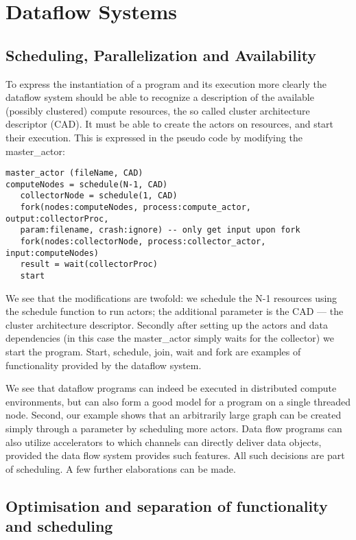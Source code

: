 \documentclass[11pt,a4paper]{article}
\begin{document}
\section{Dataflow Systems}

\subsection{Scheduling, Parallelization and Availability}

To express the instantiation of a program and its execution more
clearly the dataflow system should be able to recognize a description
of the available (possibly clustered) compute resources, the so called
cluster architecture descriptor (CAD).  It must be able to create the
actors on resources, and start their execution.  This is expressed in
the pseudo code by modifying the master\_actor:

\begin{lstlisting}
master_actor (fileName, CAD)
computeNodes = schedule(N-1, CAD)
   collectorNode = schedule(1, CAD)
   fork(nodes:computeNodes, process:compute_actor, output:collectorProc, 
   param:filename, crash:ignore) -- only get input upon fork
   fork(nodes:collectorNode, process:collector_actor, input:computeNodes)
   result = wait(collectorProc)
   start
\end{lstlisting}

We see that the modifications are twofold: we schedule the N-1
resources using the schedule function to run actors; the additional
parameter is the CAD --- the cluster architecture descriptor.
Secondly after setting up the actors and data dependencies (in this
case the master\_actor simply waits for the collector) we start the
program.  Start, schedule, join, wait and fork are examples of
functionality provided by the dataflow system.

We see that dataflow programs can indeed be executed in distributed
compute environments, but can also form a good model for a program on
a single threaded node.  Second, our example shows that an arbitrarily
large graph can be created simply through a parameter by scheduling
more actors.  Data flow programs can also utilize accelerators to
which channels can directly deliver data objects, provided the data
flow system provides such features.  All such decisions are part of
scheduling.  A few further elaborations can be made.

\subsection{Optimisation and separation of functionality and scheduling}
\end{document}
